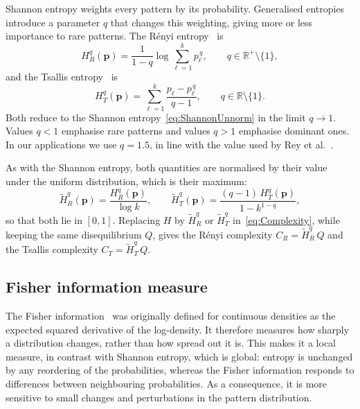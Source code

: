 Shannon entropy weights every pattern by its probability. Generalised entropies introduce a parameter $q$ that changes this weighting, giving more or less importance to rare patterns. The Rényi entropy~\cite{renyi1961measures} is
\begin{equation}
	H_{R}^{q}(\mathbf{p})=\frac{1}{1-q}\log\sum_{\ell=1}^{k}p_\ell^{\,q},\qquad q\in\mathbb{R}^{+}\setminus\{1\},
	\label{eq:Renyi}
\end{equation}
and the Tsallis entropy~\cite{tsallis1988possible} is
\begin{equation}
	H_{T}^{q}(\mathbf{p})=\sum_{\ell=1}^{k}\frac{p_\ell-p_\ell^{\,q}}{q-1},\qquad q\in\mathbb{R}\setminus\{1\}.
	\label{eq:Tsallis}
\end{equation}
Both reduce to the Shannon entropy~\eqref{eq:ShannonUnnorm} in the limit $q\to1$. Values $q<1$ emphasise rare patterns and values $q>1$ emphasise dominant ones. In our applications we use $q=1.5$, in line with the value used by Rey et al.~\cite{Rey2023}.

As with the Shannon entropy, both quantities are normalised by their value under the uniform distribution, which is their maximum:
\begin{equation}
	\widetilde{H}_{R}^{q}(\mathbf{p})=\frac{H_{R}^{q}(\mathbf{p})}{\log k},
	\qquad
	\widetilde{H}_{T}^{q}(\mathbf{p})=\frac{(q-1)\,H_{T}^{q}(\mathbf{p})}{1-k^{1-q}},
	\label{eq:NormRenyiTsallis}
\end{equation}
so that both lie in $[0,1]$. Replacing $H$ by $\widetilde{H}_{R}^{q}$ or $\widetilde{H}_{T}^{q}$ in~\eqref{eq:Complexity}, while keeping the same disequilibrium $Q$, gives the R\'enyi complexity $C_R=\widetilde{H}_{R}^{q}\,Q$ and the Tsallis complexity $C_T=\widetilde{H}_{T}^{q}\,Q$.

\subsection{Fisher information measure}\label{Subsec:Fisher}

The Fisher information~\cite{frieden2004science} was originally defined for continuous densities as the expected squared derivative of the log-density. It therefore measures how sharply a distribution changes, rather than how spread out it is. This makes it a local measure, in contrast with Shannon entropy, which is global: entropy is unchanged by any reordering of the probabilities, whereas the Fisher information responds to differences between neighbouring probabilities. As a consequence, it is more sensitive to small changes and perturbations in the pattern distribution.

